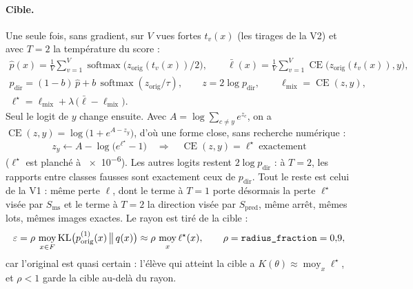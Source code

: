 \documentclass[11pt,a4paper]{article}
\newcommand{\KL}{\operatorname{KL}}
\newcommand{\Exp}{\operatorname*{moy}}
\newcommand{\orig}{\mathrm{orig}}
\newcommand{\code}[1]{\texttt{#1}}
\begin{document}
\paragraph{Cible.} Une seule fois, sans gradient, sur $V$ vues fortes $t_v(x)$ (les tirages de la
V2) et avec $T=2$ la température du score :
\begin{gather}
  \hat p(x)=\frac1V\sum_{v=1}^{V}\operatorname{softmax}\bigl(z_\orig(t_v(x))/2\bigr),\qquad
  \bar\ell(x)=\frac1V\sum_{v=1}^{V}\operatorname{CE}\bigl(z_\orig(t_v(x)),y\bigr),\label{eq:phat}\\
  p_{\text{dir}}=(1-b)\,\hat p+b\,\operatorname{softmax}(z_\orig/\tau),\qquad
  z=2\log p_{\text{dir}},\qquad \ell_{\text{mix}}=\operatorname{CE}(z,y),\label{eq:pdir}\\
  \ell^\star=\ell_{\text{mix}}+\lambda\,\bigl(\bar\ell-\ell_{\text{mix}}\bigr).\label{eq:lstar}
\end{gather}
Seul le logit de $y$ change ensuite. Avec $A=\log\sum_{c\ne y}e^{z_c}$, on a
$\operatorname{CE}(z,y)=\log\bigl(1+e^{A-z_y}\bigr)$, d'où une forme close, sans recherche
numérique :
\begin{equation}\label{eq:zy}
  z_y\leftarrow A-\log\bigl(e^{\ell^\star}-1\bigr)\quad\Longrightarrow\quad
  \operatorname{CE}(z,y)=\ell^\star\ \text{exactement}
\end{equation}
($\ell^\star$ est planché à \num{e-6}). Les autres logits restent $2\log p_{\text{dir}}$ : à $T=2$,
les rapports entre classes fausses sont exactement ceux de $p_{\text{dir}}$. Tout le reste est
celui de la V1 : même perte $\ell$, dont le terme à $T=1$ porte désormais la perte $\ell^\star$ visée
par $S_{\text{ms}}$ et le terme à $T=2$ la direction visée par $S_{\text{pred}}$, même arrêt, mêmes
lots, mêmes images exactes. Le rayon est tiré de la cible :
\begin{equation}\label{eq:epsv3}
  \varepsilon=\rho\,\Exp_{x\in F}\KL\bigl(p^{(1)}_\orig(x)\,\big\|\,q(x)\bigr)\approx\rho\,\Exp_x\ell^\star(x),
  \qquad \rho=\text{\code{radius\_fraction}}=0{,}9,
\end{equation}
car l'original est quasi certain : l'élève qui atteint la cible a $K(\theta)\approx\Exp_x\ell^\star$,
et $\rho<1$ garde la cible au-delà du rayon.
\end{document}

